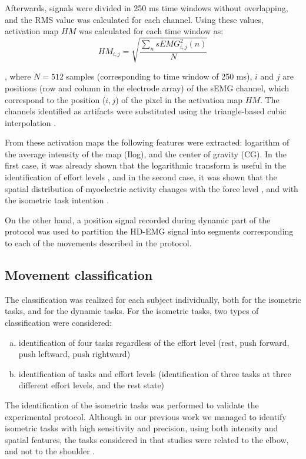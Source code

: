 Afterwards, signals were divided in 250 ms time windows without overlapping, and the RMS value was calculated for each channel. Using these values, activation map $HM$ was calculated for each time window as:
\begin{equation} \label{eq:4-1}
HM_{i,j} = \sqrt{\frac{\sum_n{sEMG_{i,j}^2 (n)}}{N}}
\end{equation}

, where $N=512$ samples (corresponding to time window of 250 ms), $i$ and $j$ are positions (row and column in the electrode array) of the sEMG channel, which correspond to the position ($i,j$) of the pixel in the activation map $HM$. The channels identified as artifacts were substituted using the triangle-based cubic interpolation \citep{Rojas-Martinez2012}.

From these activation maps the following features were extracted: logarithm of the average intensity of the map (Ilog), and the center of gravity (CG). In the first case, it was already shown that the logarithmic transform is useful in the identification of effort levels \citep{Rojas-Martinez2012}, and in the second case, it was shown that the spatial distribution of myoelectric activity changes with the force level \citep{Holtermann2005}, and with the isometric task intention \citep{Jordanic2016a}.

On the other hand, a position signal recorded during dynamic part of the protocol was used to partition the HD-EMG signal into segments corresponding to each of the movements described in the protocol.


\subsection{Movement classification}
The classification was realized for each subject individually, both for the isometric tasks, and for the dynamic tasks. For the isometric tasks, two types of classification were considered:

\begin{enumerate}[a)]
\item identification of four tasks regardless of the effort level (rest, push forward, push leftward, push rightward)

\item identification of tasks and effort levels (identification of three tasks at three different effort levels, and the rest state)
\end{enumerate}

The identification of the isometric tasks was performed to validate the experimental protocol. Although in our previous work we managed to identify isometric tasks with high sensitivity and precision, using both intensity and spatial features, the tasks considered in that studies were related to the elbow, and not to the shoulder \citep{Jordanic2016a, Jordanic2016b, Rojas-Martinez2013}.

